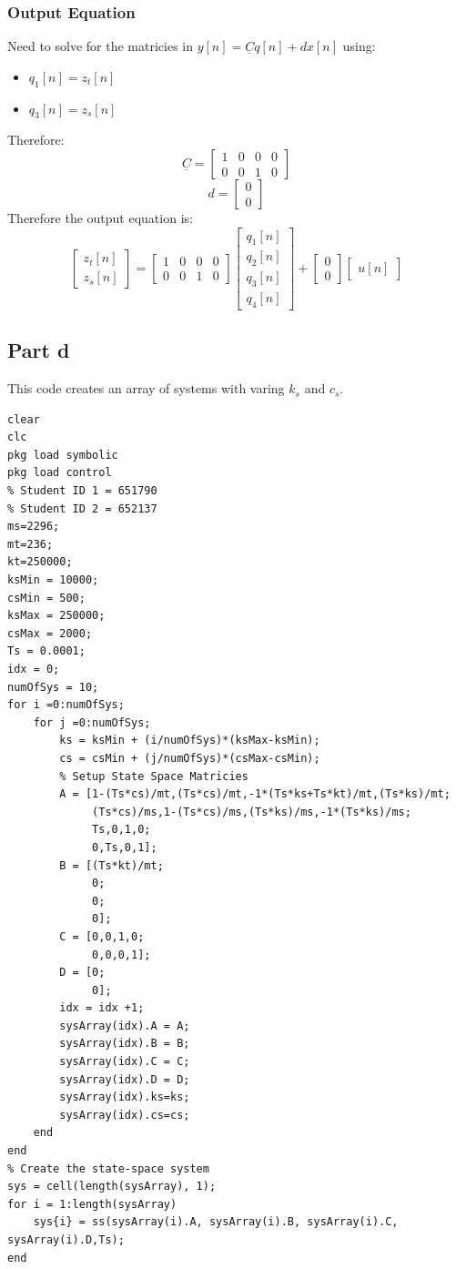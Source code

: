 \documentclass[11pt]{article}
\begin{document}
\subsubsection{Output Equation}
\label{sec:org87702d8}
Need to solve for the matricies in \(y[n]=\underline{C}q[n]+d x[n]\) using:
\begin{itemize}
\item \(q_1[n] = z_t[n]\)
\item \(q_3[n] = z_s[n]\)
\end{itemize}
Therefore:
\[\underline{C} = \begin{bmatrix}
1 & 0 & 0 & 0 \\
0 & 0 & 1 & 0
\end{bmatrix}\]
\[d = \begin{bmatrix}
0 \\
0
\end{bmatrix}\]
Therefore the output equation is:
\[\begin{bmatrix}
z_t[n] \\ z_s[n]
\end{bmatrix} = \begin{bmatrix}
1 & 0 & 0 & 0 \\
0 & 0 & 1 & 0
\end{bmatrix} \begin{bmatrix}
q_1[n] \\
q_2[n] \\
q_3[n] \\
q_4[n]
\end{bmatrix} + \begin{bmatrix}
0 \\
0
\end{bmatrix} \begin{bmatrix}
u[n]
\end{bmatrix}
\]
\subsection{Part d}
\label{sec:org398812d}
This code creates an array of systems with varing \(k_s\) and \(c_s\).
\begin{verbatim}
clear
clc
pkg load symbolic
pkg load control
% Student ID 1 = 651790
% Student ID 2 = 652137
ms=2296;
mt=236;
kt=250000;
ksMin = 10000;
csMin = 500;
ksMax = 250000;
csMax = 2000;
Ts = 0.0001;
idx = 0;
numOfSys = 10;
for i =0:numOfSys;
    for j =0:numOfSys;
        ks = ksMin + (i/numOfSys)*(ksMax-ksMin);
        cs = csMin + (j/numOfSys)*(csMax-csMin);
        % Setup State Space Matricies
        A = [1-(Ts*cs)/mt,(Ts*cs)/mt,-1*(Ts*ks+Ts*kt)/mt,(Ts*ks)/mt;
             (Ts*cs)/ms,1-(Ts*cs)/ms,(Ts*ks)/ms,-1*(Ts*ks)/ms;
             Ts,0,1,0;
             0,Ts,0,1];
        B = [(Ts*kt)/mt;
             0;
             0;
             0];
        C = [0,0,1,0;
             0,0,0,1];
        D = [0;
             0];
        idx = idx +1;
        sysArray(idx).A = A;
        sysArray(idx).B = B;
        sysArray(idx).C = C;
        sysArray(idx).D = D;
        sysArray(idx).ks=ks;
        sysArray(idx).cs=cs;
    end
end
% Create the state-space system
sys = cell(length(sysArray), 1);
for i = 1:length(sysArray)
    sys{i} = ss(sysArray(i).A, sysArray(i).B, sysArray(i).C, sysArray(i).D,Ts);
end
\end{verbatim}
\end{document}
